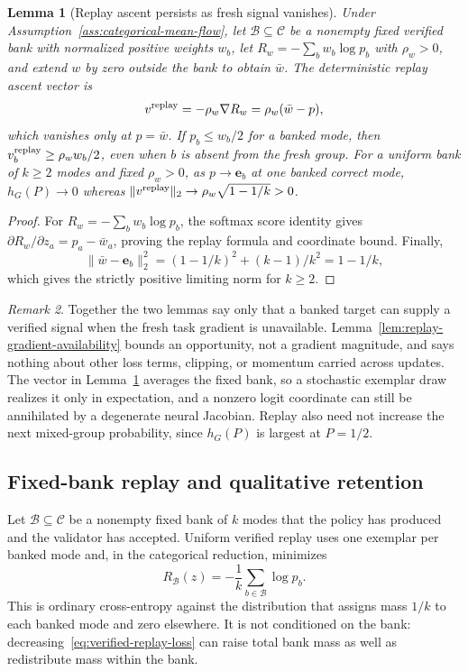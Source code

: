 \documentclass{article}
\newcommand{\1}{\mathbf 1}
\newtheorem{lemma}{Lemma}[section]
\theoremstyle{remark}
\newtheorem{remark}[lemma]{Remark}
\theoremstyle{definition}
\theoremstyle{plain}
\begin{document}
\begin{lemma}[Replay ascent persists as fresh signal vanishes]
\label{lem:replay-ascent}
Under Assumption~\ref{ass:categorical-mean-flow}, let
$\mathcal B\subseteq\mathcal C$ be a nonempty fixed verified bank with
normalized positive weights $w_b$, let $R_w=-\sum_b w_b\log p_b$ with
$\rho_w>0$, and extend $w$ by zero outside the bank to obtain $\bar w$. The
deterministic replay ascent vector is
\[
 v^{\rm replay}=-\rho_w\nabla R_w=\rho_w(\bar w-p),
\]
which vanishes only at $p=\bar w$. If $p_b\le w_b/2$ for a banked mode, then
$v^{\rm replay}_b\ge\rho_w w_b/2$, even when $b$ is absent from the fresh
group. For a uniform bank of $k\ge2$ modes and fixed $\rho_w>0$, as
$p\to\mathbf e_b$ at one banked correct mode, $h_G(P)\to0$ whereas
$\|v^{\rm replay}\|_2\to\rho_w\sqrt{1-1/k}>0$.
\end{lemma}

\begin{proof}
For $R_w=-\sum_b w_b\log p_b$, the softmax score identity gives
$\partial R_w/\partial z_a=p_a-\bar w_a$, proving the replay formula and
coordinate bound. Finally,
\[
 \|\bar w-\mathbf e_b\|_2^2=(1-1/k)^2+(k-1)/k^2=1-1/k,
\]
which gives the strictly positive limiting norm for $k\ge2$.
\end{proof}

\begin{remark}
Together the two lemmas say only that a banked target can supply a verified
signal when the fresh task gradient is unavailable. Lemma~\ref{lem:replay-gradient-availability}
bounds an opportunity, not a gradient magnitude, and says nothing about other
loss terms, clipping, or momentum carried across updates. The vector in
Lemma~\ref{lem:replay-ascent} averages the fixed bank, so a stochastic
exemplar draw realizes it only in expectation, and a nonzero logit coordinate
can still be annihilated by a degenerate neural Jacobian. Replay also need not
increase the next mixed-group probability, since $h_G(P)$ is largest at
$P=1/2$.
\end{remark}

\subsection{Fixed-bank replay and qualitative retention}
\label{app:theory-replay}

Let $\mathcal B\subseteq\mathcal C$ be a nonempty fixed bank of $k$ modes that
the policy has produced and the validator has accepted. Uniform verified replay
uses one exemplar per banked mode and, in the categorical reduction, minimizes
\begin{equation}
  R_{\mathcal B}(z)
  =-\frac1k\sum_{b\in\mathcal B}\log p_b.
  \label{eq:verified-replay-loss}
\end{equation}
This is ordinary cross-entropy against the distribution that assigns mass
$1/k$ to each banked mode and zero elsewhere. It is not conditioned on the
bank: decreasing~\eqref{eq:verified-replay-loss} can raise total bank mass as
well as redistribute mass within the bank.
\end{document}
